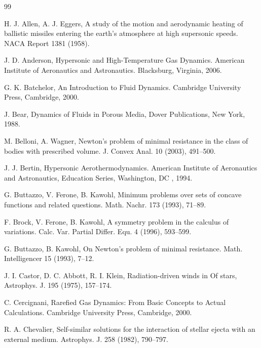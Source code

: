 \documentclass[a4paper,12pt]{amsart}
\theoremstyle{plain}
\theoremstyle{definition}
\begin{document}
\begin{thebibliography}{99}

 H. J. Allen, A. J.  Eggers,   A study of the motion and aerodynamic heating of ballistic missiles entering the earth's atmosphere at high supersonic speeds. NACA Report 1381 (1958).

 J. D.  Anderson,    Hypersonic and High-Temperature Gas Dynamics. American Institute of Aeronautics and Astronautics. Blacksburg, Virginia, 2006. 



 G. K. Batchelor, An Introduction to Fluid Dynamics. Cambridge University Press, Cambridge, 2000.




J. Bear, Dynamics of Fluids in Porous Media, Dover Publications, New York, 1988.

  M. Belloni, A. Wagner,  Newton’s problem of minimal resistance in the class of bodies with prescribed volume. J. Convex Anal. 10  (2003), 491--500.
 
 J. J. Bertin,  Hypersonic Aerothermodynamics. American Institute of Aeronautics and Astronautics, Education Series, Washington, DC , 1994.

 G. Buttazzo, V. Ferone, B. Kawohl, Minimum problems over sets of concave functions and related questions. Math. Nachr. 173 (1993), 71--89.

F. Brock, V. Ferone, B. Kawohl, A symmetry problem in the calculus of variations. Calc. Var. Partial Differ. Equ. 4 (1996), 593--599.

G. Buttazzo, B. Kawohl, On Newton's problem of minimal resistance. Math. Intelligencer 15 (1993), 7--12.

 J. I. Castor, D. C. Abbott, R. I. Klein, Radiation-driven winds in Of stars, Astrophys. J. 195 (1975), 157--174.

 C. Cercignani, 
 Rarefied Gas Dynamics: From Basic Concepts to Actual Calculations. 
 Cambridge University Press, Cambridge, 2000.
 
R. A. Chevalier, Self-similar solutions for the interaction of stellar ejecta with an external medium.
 Astrophys. J. 258 (1982), 790--797.


\end{thebibliography}
\end{document}
